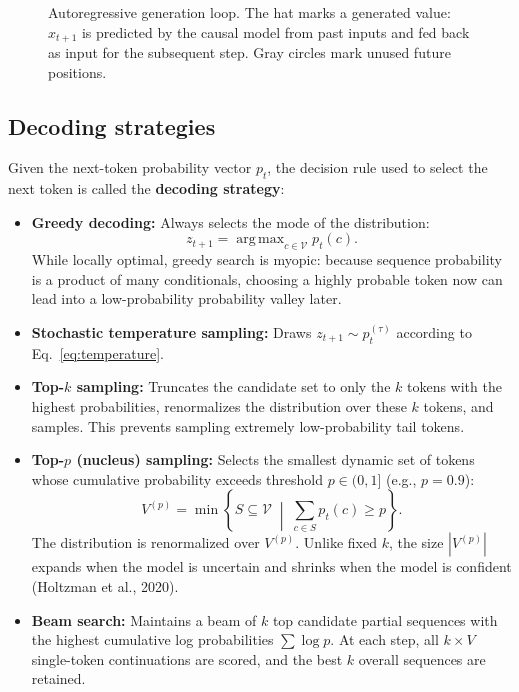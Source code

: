 \documentclass[11pt,a4paper]{article}
\DeclareMathOperator{\argmax}{arg\,max}
\newcommand{\slides}[1]{\par\nopagebreak\noindent{\normalfont\small\emph{(slides #1)}}\par\nopagebreak\vspace{2pt}}
\theoremstyle{definition}
\theoremstyle{plain}
\begin{document}
\begin{figure}[H]
\caption{Autoregressive generation loop. The hat marks a generated value: $\hat{x}_{t+1}$ is predicted by the causal model from past inputs and fed back as input for the subsequent step. Gray circles mark unused future positions.}\label{fig:autoregressive_generation}
\end{figure}

\subsection{Decoding strategies}\slides{16 / 84}
Given the next-token probability vector $p_t$, the decision rule used to select the next token is called the \textbf{decoding strategy}:
\begin{itemize}
\item \textbf{Greedy decoding:} Always selects the mode of the distribution:
\begin{equation}
z_{t+1} = \argmax_{c \in \mathcal{V}} p_t(c).
\end{equation}
While locally optimal, greedy search is myopic: because sequence probability is a product of many conditionals, choosing a highly probable token now can lead into a low-probability probability valley later.
\item \textbf{Stochastic temperature sampling:} Draws $z_{t+1} \sim p_t^{(\tau)}$ according to Eq.~\eqref{eq:temperature}.
\item \textbf{Top-$k$ sampling:} Truncates the candidate set to only the $k$ tokens with the highest probabilities, renormalizes the distribution over these $k$ tokens, and samples. This prevents sampling extremely low-probability tail tokens.
\item \textbf{Top-$p$ (nucleus) sampling:} Selects the smallest dynamic set of tokens whose cumulative probability exceeds threshold $p \in (0, 1]$ (e.g., $p=0.9$):
\begin{equation}
V^{(p)} = \min \left\{ S \subseteq \mathcal{V} \;\middle|\; \sum_{c \in S} p_t(c) \ge p \right\}.
\end{equation}
The distribution is renormalized over $V^{(p)}$. Unlike fixed $k$, the size $|V^{(p)}|$ expands when the model is uncertain and shrinks when the model is confident (Holtzman et al., 2020).
\item \textbf{Beam search:} Maintains a beam of $k$ top candidate partial sequences with the highest cumulative log probabilities $\sum \log p$. At each step, all $k \times V$ single-token continuations are scored, and the best $k$ overall sequences are retained.
\end{itemize}
\end{document}
